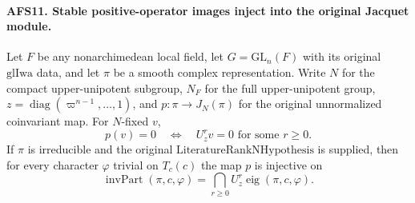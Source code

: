 \paragraph{AFS11. Stable positive-operator images inject into the original Jacquet module.}
\label{claim:AFS11}
Let $F$ be any nonarchimedean local field, let
$G=\mathrm{GL}_n(F)$ with its original $\mathrm{glIwa}$ data,
and let $\pi$ be a smooth complex representation.  Write
$N$ for the compact upper-unipotent subgroup, $N_F$ for the
full upper-unipotent group, $z=\operatorname{diag}
(\varpi^{n-1},\ldots,1)$, and $p:\pi\to J_N(\pi)$ for the
original unnormalized coinvariant map.  For $N$-fixed $v$,
\begin{equation}\label{eq:afs-jac-kernel}
 p(v)=0\quad\Longleftrightarrow\quad
                      U_z^rv=0\text{ for some }r\geq0.
\end{equation}
If $\pi$ is irreducible and the original
$\mathrm{LiteratureRankNHypothesis}$ is supplied, then for
every character $\varphi$ trivial on $T_c(c)$ the map $p$
is injective on
\[
 \operatorname{invPart}(\pi,c,\varphi)
       =\bigcap_{r\geq0}U_z^r\operatorname{eig}(\pi,c,\varphi).
\]
